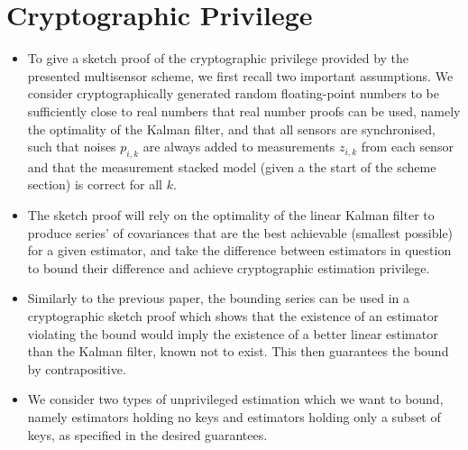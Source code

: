 \documentclass[conference]{IEEEtran}
\begin{document}
\section{Cryptographic Privilege}\label{sec:crypto}
\begin{itemize}
  \item To give a sketch proof of the cryptographic privilege provided by the presented multisensor scheme, we first recall two important assumptions. We consider cryptographically generated random floating-point numbers to be sufficiently close to real numbers that real number proofs can be used, namely the optimality of the Kalman filter, and that all sensors are synchronised, such that noises $p_{i,k}$ are always added to measurements $z_{i,k}$ from each sensor and that the measurement stacked model (given a the start of the scheme section) is correct for all $k$.
  \item The sketch proof will rely on the optimality of the linear Kalman filter to produce series' of covariances that are the best achievable (smallest possible) for a given estimator, and take the difference between estimators in question to bound their difference and achieve cryptographic estimation privilege.
  \item Similarly to the previous paper, the bounding series can be used in a cryptographic sketch proof which shows that the existence of an estimator violating the bound would imply the existence of a better linear estimator than the Kalman filter, known not to exist. This then guarantees the bound by contrapositive.
  \item We consider two types of unprivileged estimation which we want to bound, namely estimators holding no keys and estimators holding only a subset of keys, as specified in the desired guarantees.
\end{itemize}
\end{document}
